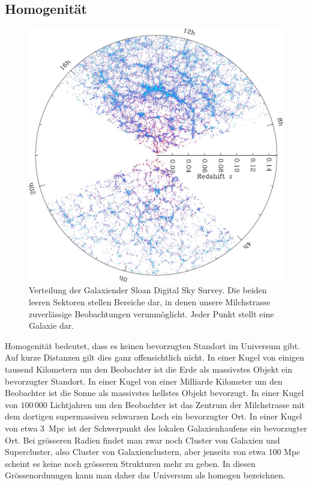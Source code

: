 \subsection{Homogenität}
\begin{figure}
\centering
\includegraphics[width=\hsize]{chapters/images/orangepie-negative.jpg}
\caption{Verteilung der Galaxiender Sloan Digital Sky Survey.
Die beiden leeren Sektoren stellen Bereiche dar, in denen unsere
Milchstrasse zuverlässige Beobachtungen verunmöglicht.
Jeder Punkt stellt eine Galaxie dar.
\label{skript:robertson:orangepie}}
\end{figure}
%
Homogenität bedeutet, dass es keinen bevorzugten Standort im Universum gibt.
Auf kurze Distanzen gilt dies ganz offensichtlich nicht.
In einer Kugel von einigen tausend Kilometern um den Beobachter ist
die Erde als massivstes Objekt ein bevorzugter Standort.
In einer Kugel von einer Milliarde Kilometer um den Beobachter ist
die Sonne als massivstes hellstes Objekt bevorzugt.
In einer Kugel von $100\,000$ Lichtjahren um den Beobachter ist das Zentrum
der Milchstrasse mit dem dortigen supermassiven schwarzen Loch ein
bevorzugter Ort.
In einer Kugel von etwa 3~Mpc ist der Schwerpunkt des lokalen Galaxienhaufens
ein bevorzugter Ort.
Bei grösseren Radien findet man zwar noch Cluster von Galaxien und
Supercluster, also Cluster von Galaxienclustern, aber jenseits von
etwa 100 Mpc scheint es keine noch grösseren Strukturen mehr zu geben.
In diesen Grössenordnungen kann man daher das Universum als homogen
bezeichnen.

